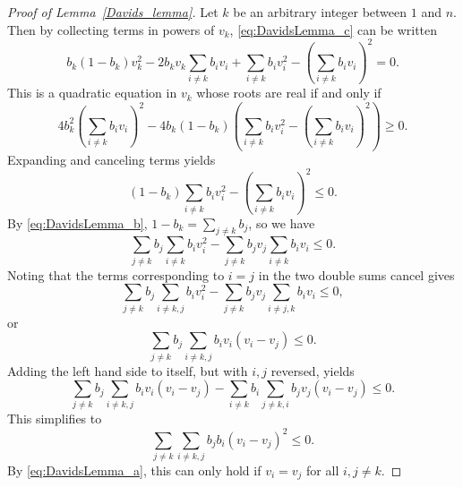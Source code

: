 \begin{proof}[Proof of Lemma~\ref{Davids_lemma}]
    Let \( k \) be an arbitrary integer between \( 1 \) and \( n \). Then by collecting terms in powers of \( v_k \),
\eqref{eq:DavidsLemma_c} can be written
\begin{equation*}
  b_{k}(1-b_{k})v_{k}^{2} - 2b_{k}v_{k}\sum_{i \neq k}b_{i}v_{i} + \sum_{i \neq k}b_{i}v_{i}^{2} - \left(\sum_{i \neq k}b_{i}v_{i}\right)^{2} = 0.
\end{equation*}
This is a quadratic equation in \( v_{k} \) whose roots are real if and only if
\begin{equation*}
    4b_{k}^{2}\left(\sum_{i \neq k}b_{i}v_{i}\right)^{2} - 4b_{k}(1-b_{k})\left(\sum_{i \neq k}b_{i}v_{i}^{2} - \left(\sum_{i \neq k}b_{i}v_{i}\right)^{2}\right) \geq 0.
\end{equation*}
Expanding and canceling terms yields
\begin{equation*}
    (1-b_{k})\sum_{i \neq k}b_{i}v_{i}^{2} - \left(\sum_{i \neq k}b_{i}v_{i} \right)^{2} \leq 0.
\end{equation*}
By \eqref{eq:DavidsLemma_b}, \( 1-b_{k} = \sum_{j \ne k}b_{j} \), so we have
\begin{equation*}
    \sum_{j \neq k}b_{j}\sum_{i \neq k}b_{i}v_{i}^{2} - \sum_{j \neq k}b_{j}v_{j}\sum_{i \neq k}b_{i}v_{i} \le 0.
\end{equation*}
Noting that the terms corresponding to \( i = j \) in the two double sums cancel gives
\begin{equation*}
    \sum_{j \neq k}b_{j}\sum_{i \neq k,j}b_{i}v_{i}^{2} - \sum_{j \neq k}b_{j}v_{j}\sum_{i \neq j,k}b_{i}v_{i} \leq 0,
\end{equation*}
or
\begin{equation*}
    \sum_{j \neq k}b_{j}\sum_{i \neq k,j}b_{i}v_{i}(v_{i} - v_{j}) \leq 0.
\end{equation*}
Adding the left hand side to itself, but with \( i,j \) reversed, yields
\begin{equation*}
    \sum_{j \neq k}b_{j}\sum_{i \neq k,j}b_{i}v_{i}(v_{i} - v_{j}) - \sum_{i \neq k}b_{i}\sum_{j \neq k,i}b_{j}v_{j}(v_{i} - v_{j}) \leq 0.
\end{equation*}
This simplifies to
\begin{equation*}
    \sum_{j \neq k}\sum_{i \neq k,j}b_{j}b_{i}(v_{i} - v_{j})^{2} \leq 0.
\end{equation*}
By \eqref{eq:DavidsLemma_a}, this can only hold if \( v_{i} = v_{j} \) for all \( i,j \neq k \).
\end{proof}

